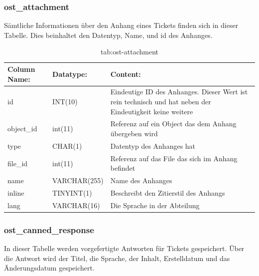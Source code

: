 \subsubsection{ost\_attachment}

Sämtliche Informationen über den Anhang eines Tickets finden sich in dieser Tabelle. Dies beinhaltet den Datentyp, Name, und id des Anhanges. 

\begin{table}[h]
	\begin{tabular}{|p{3.5cm}|p{4cm}|p{6.2cm}|}
		\hline
		\textbf{Column Name:} & \textbf{Datatype:} & \textbf{Content:} \\
		\hline
		id & INT(10) & Eindeutige ID des Anhanges. Dieser Wert ist rein technisch und hat  neben der Eindeutigkeit keine weitere  \\
		\hline
		object\_id & int(11) & Referenz auf ein Object das dem Anhang übergeben wird \\
		\hline
		type & CHAR(1) & Datentyp des Anhanges hat \\
		\hline
		file\_id & int(11) & Referenz auf das File das sich im Anhang befindet\\
		\hline
		name & VARCHAR(255) & Name des Anhanges \\
		\hline
		inline & TINYINT(1) & Beschreibt den Zitierstil des Anhangs \\
		\hline
		lang & VARCHAR(16) & Die Sprache in der Abteilung \\
		\hline
	\end{tabular}
	\caption{tab:ost-attachment}
\end{table}
\label{tab:ost_attachment}

\newpage

\subsubsection{ost\_canned\_response}

In dieser Tabelle werden vorgefertigte Antworten für Tickets gespeichert. Über die Antwort wird der Titel, die Sprache, der Inhalt, Erstelldatum und das Änderungsdatum gespeichert.


